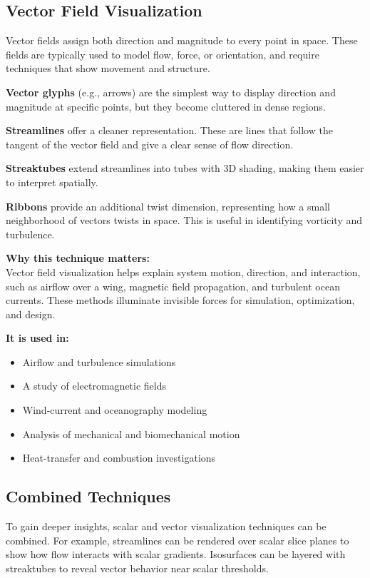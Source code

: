 \documentclass[11pt]{article}
\begin{document}
	\subsection{Vector Field Visualization}
	Vector fields assign both direction and magnitude to every point in space. These fields are typically used to model flow, force, or orientation, and require techniques that show movement and structure.
	
	\textbf{Vector glyphs} (e.g., arrows) are the simplest way to display direction and magnitude at specific points, but they become cluttered in dense regions.
	
	\textbf{Streamlines} offer a cleaner representation. These are lines that follow the tangent of the vector field and give a clear sense of flow direction.
	
	\textbf{Streaktubes} extend streamlines into tubes with 3D shading, making them easier to interpret spatially.
	
	\textbf{Ribbons} provide an additional twist dimension, representing how a small neighborhood of vectors twists in space. This is useful in identifying vorticity and turbulence.
	
	
	\vspace{1em}
\noindent
\textbf{Why this technique matters:} \\
Vector field visualization helps explain system motion, direction, and interaction, such as airflow over a wing, magnetic field propagation, and turbulent ocean currents. These methods illuminate invisible forces for simulation, optimization, and design.

\vspace{0.5em}
\noindent
\textbf{It is used in:}
\begin{itemize}
    \item Airflow and turbulence simulations
    \item A study of electromagnetic fields
    \item Wind-current and oceanography modeling
    \item Analysis of mechanical and biomechanical motion
    \item Heat-transfer and combustion investigations
\end{itemize}

	\subsection{Combined Techniques}
	To gain deeper insights, scalar and vector visualization techniques can be combined. For example, streamlines can be rendered over scalar slice planes to show how flow interacts with scalar gradients. Isosurfaces can be layered with streaktubes to reveal vector behavior near scalar thresholds.
	
\end{document}
